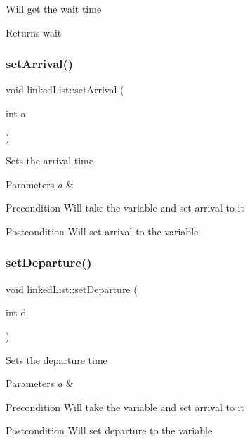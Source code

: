 Will get the wait time \begin{DoxyReturn}{Returns}
wait 
\end{DoxyReturn}
\mbox{\label{classlinked_list_a1a2f18904ea46c14b153cbc7f9201c06}} 
\subsubsection{\texorpdfstring{set\+Arrival()}{setArrival()}}
{\footnotesize\ttfamily void linked\+List\+::set\+Arrival (\begin{DoxyParamCaption}\item[{int}]{a }\end{DoxyParamCaption})}

Sets the arrival time 
\begin{DoxyParams}{Parameters}
{\em a} & \\
\hline
\end{DoxyParams}
\begin{DoxyPrecond}{Precondition}
Will take the variable and set arrival to it 
\end{DoxyPrecond}
\begin{DoxyPostcond}{Postcondition}
Will set arrival to the variable 
\end{DoxyPostcond}
\mbox{\label{classlinked_list_a6ba130a20a2de8854acf893e2c18e7d2}} 
\subsubsection{\texorpdfstring{set\+Departure()}{setDeparture()}}
{\footnotesize\ttfamily void linked\+List\+::set\+Departure (\begin{DoxyParamCaption}\item[{int}]{d }\end{DoxyParamCaption})}

Sets the departure time 
\begin{DoxyParams}{Parameters}
{\em a} & \\
\hline
\end{DoxyParams}
\begin{DoxyPrecond}{Precondition}
Will take the variable and set arrival to it 
\end{DoxyPrecond}
\begin{DoxyPostcond}{Postcondition}
Will set departure to the variable 
\end{DoxyPostcond}
\mbox{\label{classlinked_list_a1a1d1fb53e005c7eecb2790aa84ad761}} 
